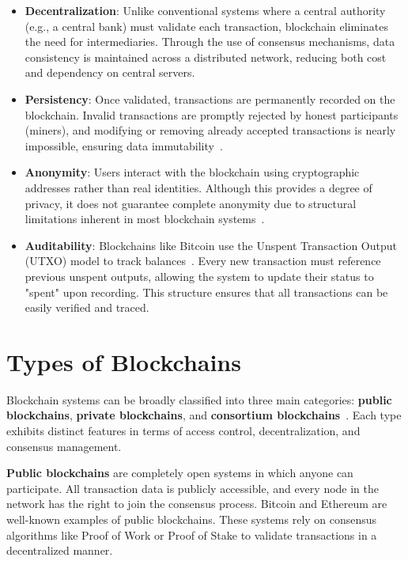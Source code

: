 \begin{itemize}
  \item \textbf{Decentralization}: Unlike conventional systems where a central authority (e.g., a central bank) must validate each transaction, blockchain eliminates the need for intermediaries. Through the use of consensus mechanisms, data consistency is maintained across a distributed network, reducing both cost and dependency on central servers.

  \item \textbf{Persistency}: Once validated, transactions are permanently recorded on the blockchain. Invalid transactions are promptly rejected by honest participants (miners), and modifying or removing already accepted transactions is nearly impossible, ensuring data immutability~\cite{nakamoto2008bitcoin}.

  \item \textbf{Anonymity}: Users interact with the blockchain using cryptographic addresses rather than real identities. Although this provides a degree of privacy, it does not guarantee complete anonymity due to structural limitations inherent in most blockchain systems~\cite{nakamoto2008bitcoin}.

  \item \textbf{Auditability}: Blockchains like Bitcoin use the Unspent Transaction Output (UTXO) model to track balances~\cite{nakamoto2008bitcoin}. Every new transaction must reference previous unspent outputs, allowing the system to update their status to "spent" upon recording. This structure ensures that all transactions can be easily verified and traced.
\end{itemize}

\section{Types of Blockchains}
Blockchain systems can be broadly classified into three main categories: \textbf{public blockchains}, \textbf{private blockchains}, and \textbf{consortium blockchains}~\cite{buterin2015blockchains}. Each type exhibits distinct features in terms of access control, decentralization, and consensus management.

\textbf{Public blockchains} are completely open systems in which anyone can participate. All transaction data is publicly accessible, and every node in the network has the right to join the consensus process. Bitcoin and Ethereum are well-known examples of public blockchains. These systems rely on consensus algorithms like Proof of Work or Proof of Stake to validate transactions in a decentralized manner.

